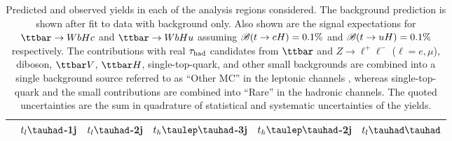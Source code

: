 \begin{table}[htbp]
\caption{
  Predicted and observed yields in each of the analysis regions considered. The background prediction is shown after fit to data with background only.
  Also shown are the signal expectations for $\Hc$ and
  $\Hu$ assuming $\mathscr{B}(t\to cH)=0.1\%$ and $\mathscr{B}(t\to uH)=0.1\%$ respectively. The contributions with real $\tau_{\mathrm{had}}$ candidates from $\ttbar$ and  $Z\to \ell^+\ell^-$ ($\ell = e, \mu$),
  diboson, $\ttbar V$, $\ttbar H$, single-top-quark, and other small backgrounds are combined into a single background source referred to as ``Other MC'' in the leptonic channels ,
  whereas single-top-quark and the small contributions are combined into ``Rare'' in the hadronic channels.
  The quoted uncertainties are the sum in quadrature of statistical and systematic uncertainties of the yields.}
\small
\centering

\begin{tabular}{cccccc} \toprule\toprule
 & $t_l\tauhad$-1j & $t_l\tauhad$-2j & $t_h\tlhad$-3j &$t_h\tlhad$-2j  & $t_l\thadhad$ \\\hline


\end{tabular}
\end{table}
